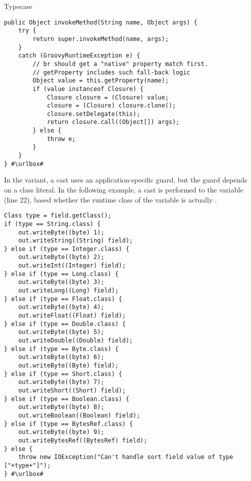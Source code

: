 \begin{pattern}{Typecase}
\def\urlvar{http://bit.ly/groovy_groovy_core_2SGzK16}
\begin{verbatim}
public Object invokeMethod(String name, Object args) {
    try {
        return super.invokeMethod(name, args);
    }
    catch (GroovyRuntimeException e) {
        // br should get a "native" property match first.
        // getProperty includes such fall-back logic
        Object value = this.getProperty(name);
        if (value instanceof Closure) {
            Closure closure = (Closure) value;
            closure = (Closure) closure.clone();
            closure.setDelegate(this);
            return closure.call((Object[]) args);
        } else {
            throw e;
        }
    }
} #\urlbox#
\end{verbatim}

In the  variant, a cast uses an application-specific guard, but the guard depends on a class literal.
In the following example,
a cast is performed to the  variable (line 22),
based whether the runtime class of the variable is actually .

\def\urlvar{http://bit.ly/elastic_elasticsearch_2SSgsFV}
\begin{verbatim}
Class type = field.getClass();
if (type == String.class) {
    out.writeByte((byte) 1);
    out.writeString((String) field);
} else if (type == Integer.class) {
    out.writeByte((byte) 2);
    out.writeInt((Integer) field);
} else if (type == Long.class) {
    out.writeByte((byte) 3);
    out.writeLong((Long) field);
} else if (type == Float.class) {
    out.writeByte((byte) 4);
    out.writeFloat((Float) field);
} else if (type == Double.class) {
    out.writeByte((byte) 5);
    out.writeDouble((Double) field);
} else if (type == Byte.class) {
    out.writeByte((byte) 6);
    out.writeByte((Byte) field);
} else if (type == Short.class) {
    out.writeByte((byte) 7);
    out.writeShort((Short) field);
} else if (type == Boolean.class) {
    out.writeByte((byte) 8);
    out.writeBoolean((Boolean) field);
} else if (type == BytesRef.class) {
    out.writeByte((byte) 9);
    out.writeBytesRef((BytesRef) field);
} else {
    throw new IOException("Can't handle sort field value of type ["+type+"]");
} #\urlbox#
\end{verbatim}


\end{pattern}
